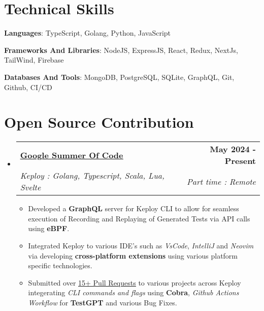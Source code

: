 \documentclass[a4paper,11pt]{article}
\makeatletter
\newcommand{\resumeSubheading}[4]{
  \vspace{-2pt}\item
    \begin{tabular*}{1.0\textwidth}[t]{l@{\extracolsep{\fill}}r}
      \textbf{#1} & \textbf{\small #2} \\
      \textit{\small#3} & \textit{\small #4} \\
    \end{tabular*}\vspace{-7pt}
}
\newcommand{\resumeSubHeadingListStart}{\begin{itemize}[leftmargin=0.0in, label={}]}
\newcommand{\resumeSubHeadingListEnd}{\end{itemize}}
\newcommand{\resumeItemListStart}{\begin{itemize}}
\newcommand{\resumeItemListEnd}{\end{itemize}\vspace{-5pt}}
\makeatother
\begin{document}
\section{Technical Skills}
 \begin{itemize}[leftmargin=0.15in, label={}]
    \small{\item{
     \textbf{Languages}{: TypeScript, Golang, Python, JavaScript}
     
    \textbf{Frameworks And Libraries}{: NodeJS, ExpressJS, React, Redux, NextJs, TailWind, Firebase} 
     
     \textbf{Databases And Tools}{: MongoDB, PostgreSQL, SQLite, GraphQL, Git, Github, CI/CD} \\
    
    }}
 \end{itemize}
 \vspace{-13pt}
\section{Open Source Contribution}
    \resumeSubHeadingListStart
        \resumeSubheading
            {\underline{\href{https://summerofcode.withgoogle.com/programs/2024/projects/XKj0YXC7}{Google Summer Of Code}}}
            {May 2024 - Present}
            {Keploy : Golang, Typescript, Scala, Lua, Svelte }{Part time : Remote}
            \resumeItemListStart
                \item Developed a \textbf{GraphQL} server for Keploy CLI to allow for seamless execution of Recording and Replaying of Generated Tests via API calls using \textbf{eBPF}.
                \item Integrated Keploy to various IDE's such as \textit{VsCode}, \textit{IntelliJ} and \textit{Neovim} via developing \textbf{cross-platform extensions} using various platform specific technologies.
                \item Submitted over \underline{\href{https://gist.github.com/Akash-Singh04/6583e1be7b05b818df7d5b224b37df67}{15+ Pull Requests}} to various projects across Keploy integerating \textit{CLI commands and flags} using \textbf{Cobra}, \textit{Github Actions Workflow} for \textbf{TestGPT} and various Bug Fixes.
            \resumeItemListEnd
    \resumeSubHeadingListEnd
\vspace{-12pt}
\end{document}
